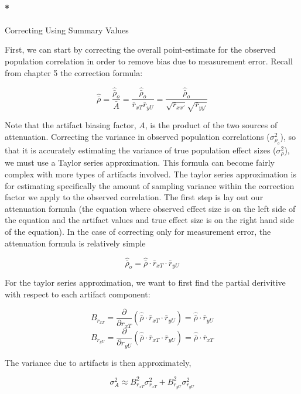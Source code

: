 \documentclass[
  letterpaper,
  DIV=11,
  numbers=noendperiod]{scrreprt}
\let\oldparagraph\paragraph
\renewcommand{\paragraph}[1]{\oldparagraph{#1}\mbox{}}
\begin{document}
\hypertarget{correcting-using-summary-values}{%
\paragraph*{Correcting Using Summary
Values}\label{correcting-using-summary-values}}

First, we can start by correcting the overall point-estimate for the
observed population correlation in order to remove bias due to
measurement error. Recall from chapter 5 the correction formula:

\[
\hat{\bar{\rho}} = \frac{\hat{\bar{\rho}}_o}{\bar{A}} = \frac{\hat{\bar{\rho}}_o}{\bar{r}_{xT} \bar{r}_{yU}} = \frac{\hat{\bar{\rho}}_o}{\sqrt{\bar{r}_{xx'}} \sqrt{\bar{r}_{yy'}}}
\]

Note that the artifact biasing factor, \(A\), is the product of the two
sources of attenuation. Correcting the variance in observed population
correlations (\(\sigma^2_{\rho_o}\)), so that it is accurately
estimating the variance of true population effect sizes
(\(\sigma^2_{\rho}\)), we must use a Taylor series approximation. This
formula can become fairly complex with more types of artifacts involved.
The taylor series approximation is for estimating specifically the
amount of sampling variance within the correction factor we apply to the
observed correlation. The first step is lay out our attenuation formula
(the equation where observed effect size is on the left side of the
equation and the artifact values and true effect size is on the right
hand side of the equation). In the case of correcting only for
measurement error, the attenuation formula is relatively simple

\[
\hat{\bar{\rho}}_o = \hat{\bar{\rho}}\cdot \bar{r}_{xT}\cdot \bar{r}_{yU}
\]

For the taylor series approximation, we want to first find the partial
derivitive with respect to each artifact component:

\[
B_{r_{xT}}=\frac{\partial}{\partial r_{xT}} (\hat{\bar{\rho}}\cdot \bar{r}_{xT}\cdot \bar{r}_{yU}) = \hat{\bar{\rho}}\cdot \bar{r}_{yU}
\] \[
B_{r_{yU}}=\frac{\partial}{\partial r_{yU}} (\hat{\bar{\rho}}\cdot \bar{r}_{xT}\cdot \bar{r}_{yU}) = \hat{\bar{\rho}}\cdot \bar{r}_{xT}
\]

The variance due to artifacts is then approximately,

\[
\sigma^2_A\approx B^2_{r_{xT}} \sigma^2_{r_{xT}} + B^2_{r_{yU}} \sigma^2_{r_{yU}}
\]
\end{document}
